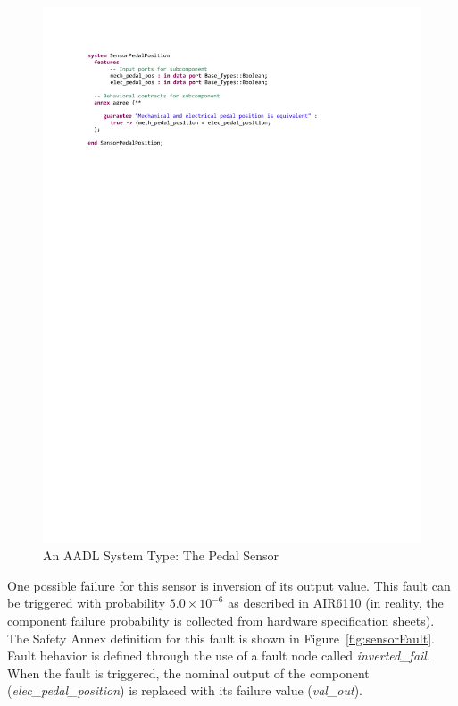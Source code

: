 \begin{figure}[h!]
	\hspace*{-2cm}
	\begin{center}
		\includegraphics[trim=0 640 -10 70,clip,width=1.5\dimexpr\textwidth-2cm\relax]{images/system_sensor.pdf}
		\vspace{-0.3in}
		\caption{An AADL System Type: The Pedal Sensor}
		\label{fig:sensor}
	\end{center}
	\vspace{-0.2in}
\end{figure}

One possible failure for this sensor is inversion of its output value. This fault can be triggered with probability $5.0\times 10^{-6}$ as described in AIR6110 (in reality, the component failure probability is 
collected from hardware specification sheets).  
The Safety Annex definition for this fault is shown in Figure~\ref{fig:sensorFault}. Fault behavior is defined through the use of a fault node called \textit{inverted\_fail}.  When the fault is triggered, the nominal output of the component (\textit{elec\_pedal\_position}) is replaced with its failure value (\textit{val\_out}). 

